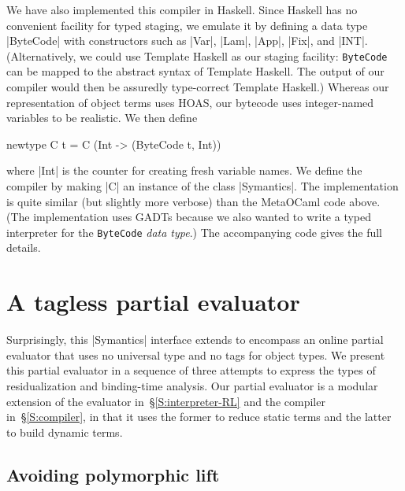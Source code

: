 We have also implemented this compiler in Haskell. 
Since Haskell
has no convenient facility for typed staging, we emulate
it by defining a data type |ByteCode| with
constructors such as |Var|, |Lam|, |App|, |Fix|, and |INT|.
(Alternatively, we could use Template Haskell \citep{sheard-template} as our staging facility:
\texttt{ByteCode} can be mapped to the abstract syntax of Template
Haskell. The output of our compiler would then be assuredly type-correct
Template Haskell.)
Whereas our representation of object terms uses HOAS,
our bytecode uses integer-named
variables to be realistic. 
We then define 
\begin{code}
newtype C t = C (Int -> (ByteCode t, Int)) 
\end{code}
where |Int| is the counter for creating fresh variable
names. We define the compiler by making |C| an instance of the
class |Symantics|.
The implementation is quite similar (but slightly more
verbose) than the MetaOCaml code above. (The implementation uses
GADTs because we also wanted to write a typed interpreter for 
the \texttt{ByteCode} \emph{data type}.) The
accompanying code gives the full details.
\fi

\ifshort

\else

\section{A tagless partial evaluator}\label{PE}
Surprisingly, this |Symantics| interface extends to
encompass an online partial evaluator that uses no universal type and no tags
for object types.  We present this partial evaluator
in a sequence of three attempts to express the types
of residualization and binding-time
analysis.  Our partial evaluator is a modular extension of the evaluator
in~\S\ref{S:interpreter-RL} and the compiler in~\S\ref{S:compiler}, in
that it uses the former to reduce static terms and the latter to build
dynamic terms.

\subsection{Avoiding polymorphic lift}
\label{S:PE-lift}

